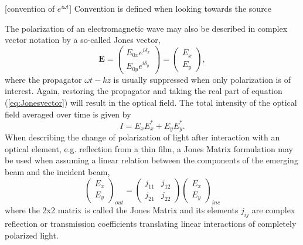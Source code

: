 [convention of $e^{i\omega t}$] Convention is defined when looking towards the source

The polarization of an electromagnetic wave may also be described in complex vector notation by a so-called Jones vector, 
\begin{equation}
    \mathbf{E} = 
    \begin{pmatrix}
        E_{0x}e^{i\delta_x} \\
        E_{0y}e^{i\delta_y} 
    \end{pmatrix}
    =
    \begin{pmatrix}
        E_{x} \\
        E_{y} 
    \end{pmatrix},
    \label{eq:Jonesvector}
\end{equation}
where the propagator $\omega t - kz$ is usually suppressed when only polarization is of interest\cite{collett}. Again, restoring the propagator and taking the real part of equation (\ref{eq:Jonesvector}) will result in the optical field. The total intensity of the optical field averaged over time is given by
\begin{equation}
    I = E_xE_x^* + E_yE_y^*.
\end{equation}
When describing the change of polarization of light after interaction with an optical element, e.g. reflection from a thin film, a Jones Matrix formulation may be used when assuming a linear relation between the components of the emerging beam and the incident beam,
\begin{equation}
    \begin{pmatrix}
        E_{x} \\
        E_{y} 
    \end{pmatrix}_{out}
    =
    \begin{pmatrix}
        j_{11} & j_{12} \\
        j_{21} & j_{22} 
    \end{pmatrix}
    \begin{pmatrix}
        E_{x} \\
        E_{y} 
    \end{pmatrix}_{inc}
\end{equation}
where the 2x2 matrix is called the Jones Matrix and its elements $j_{ij}$ are complex reflection or transmission coefficients translating linear interactions of completely polarized light.

